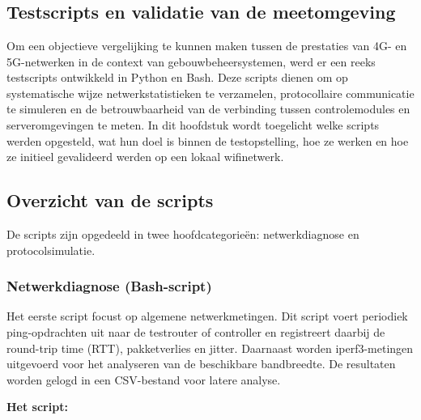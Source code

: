 \chapter{}%
\label{ch:scripts}

\section{Testscripts en validatie van de meetomgeving}

Om een objectieve vergelijking te kunnen maken tussen de prestaties van 4G- en 5G-netwerken in de context van gebouwbeheersystemen, werd er een reeks testscripts ontwikkeld in Python en Bash. Deze scripts dienen om op systematische wijze netwerkstatistieken te verzamelen, protocollaire communicatie te simuleren en de betrouwbaarheid van de verbinding tussen controlemodules en serveromgevingen te meten. In dit hoofdstuk wordt toegelicht welke scripts werden opgesteld, wat hun doel is binnen de testopstelling, hoe ze werken en hoe ze initieel gevalideerd werden op een lokaal wifinetwerk.

\section{Overzicht van de scripts}

De scripts zijn opgedeeld in twee hoofdcategorieën: netwerkdiagnose en protocolsimulatie.

\subsection*{Netwerkdiagnose (Bash-script)}

Het eerste script focust op algemene netwerkmetingen. Dit script voert periodiek ping-opdrachten uit naar de testrouter of controller en registreert daarbij de round-trip time (RTT), pakketverlies en jitter. Daarnaast worden iperf3-metingen uitgevoerd voor het analyseren van de beschikbare bandbreedte. De resultaten worden gelogd in een CSV-bestand voor latere analyse.

\textbf{Het script:}
%    

